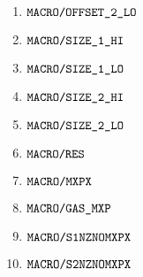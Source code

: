 \begin{description}
\begin{multicols}{3}
\begin{enumerate}
				\item $\mxpMacroOffsetTwoLo  $
				\item $\mxpMacroSizeOneHi    $
				\item $\mxpMacroSizeOneLo    $
				\item $\mxpMacroSizeTwoHi    $
				\item $\mxpMacroSizeTwoLo    $
				\item $\mxpMacroRes          $
				\item $\mxpMacroMxpx         $
				\item $\mxpMacroGasMxp       $
				\item $\mxpMacroSOneNzNoMxpx $
				\item $\mxpMacroSTwoNzNoMxpx $
			\end{enumerate}
		\end{multicols}
\end{description}

\mxpMacroDeploying                        
